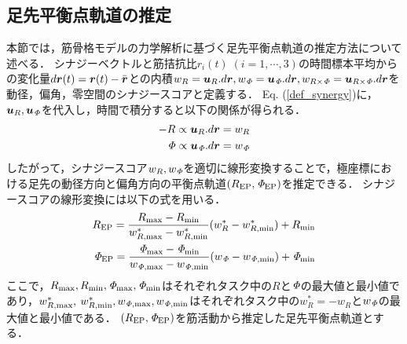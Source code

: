 \subsection{足先平衡点軌道の推定}
本節では，筋骨格モデルの力学解析に基づく足先平衡点軌道の推定方法について述べる．
シナジーベクトルと筋拮抗比$r_i(t)\;(i=1,\cdots,3)$の時間標本平均からの変化量$d\mbox{\boldmath $r$}(t)=\mbox{\boldmath $r$}(t)-\bar{\mbox{\boldmath $r$}}$との内積$w_R=\mbox{\boldmath $u$}_R.d\mbox{\boldmath $r$},w_{\it \Phi}=\mbox{\boldmath $u$}_{\it \Phi}.d\mbox{\boldmath $r$},w_{R\times{\it \Phi}}=\mbox{\boldmath $u$}_{R\times{\it \Phi}}.d\mbox{\boldmath $r$}$を動径，偏角，零空間のシナジースコアと定義する．
Eq. (\ref{def_synergy})に，$\mbox{\boldmath $u$}_R,\mbox{\boldmath $u$}_{\it \Phi}$を代入し，時間で積分すると以下の関係が得られる．
\begin{eqnarray}
 -R\propto\mbox{\boldmath $u$}_R.d\mbox{\boldmath $r$}=w_R\\
 {\it \Phi}\propto\mbox{\boldmath $u$}_{\it \Phi}.d\mbox{\boldmath $r$}=w_{\it \Phi}
\end{eqnarray}
したがって，シナジースコア$w_R,w_{\it \Phi}$を適切に線形変換することで，極座標における足先の動径方向と偏角方向の平衡点軌道$(R_{\rm EP},{\it \Phi}_{\rm EP})$を推定できる．
シナジースコアの線形変換には以下の式を用いる．
\begin{eqnarray}
 R_{\rm EP}=\frac{R_{\rm max}-R_{\rm min}}{w^*_{R,{\rm max}}-w^*_{R,{\rm min}}}(w^*_R-w^*_{R,{\rm min}})+R_{\rm min}\\
 {\it \Phi}_{\rm EP}=\frac{{\it \Phi}_{\rm max}-{\it \Phi}_{\rm min}}{w_{{\it \Phi},{\rm max}}-w_{{\it \Phi},{\rm min}}}(w_{\it \Phi}-w_{{\it \Phi},{\rm min}})+{\it \Phi}_{\rm min}
\end{eqnarray}
ここで，$R_{\rm max},R_{\rm min},{\it \Phi}_{\rm max},{\it \Phi}_{\rm min}$はそれぞれタスク中の$R$と${\it \Phi}$の最大値と最小値であり，$w^*_{R,{\rm max}},$
$w^*_{R,{\rm min}},w_{{\it \Phi},{\rm max}},w_{{\it \Phi},{\rm min}}$はそれぞれタスク中の$w^*_R=-w_R$と$w_{\it \Phi}$の最大値と最小値である．
$(R_{\rm EP},{\it \Phi}_{\rm EP})$を筋活動から推定した足先平衡点軌道とする．

